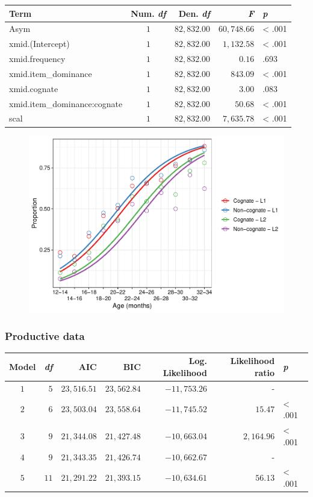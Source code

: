 \documentclass[
  english,
  man,man,floatsintext]{apa6}
\begin{document}
\captionsetup[table]{labelformat=empty,skip=1pt}
\begin{longtable}{lcrrl}
\toprule
Term & Num. \emph{df} & Den. \emph{df} & \emph{F} & \emph{p} \\ 
\midrule
Asym & $1$ & $82,832.00$ & $60,748.66$ & < .001 \\ 
xmid.(Intercept) & $1$ & $82,832.00$ & $1,132.58$ & < .001 \\ 
xmid.frequency & $1$ & $82,832.00$ & $0.16$ & .693 \\ 
xmid.item\_dominance & $1$ & $82,832.00$ & $843.09$ & < .001 \\ 
xmid.cognate & $1$ & $82,832.00$ & $3.00$ & .083 \\ 
xmid.item\_dominance:cognate & $1$ & $82,832.00$ & $50.68$ & < .001 \\ 
scal & $1$ & $82,832.00$ & $7,635.78$ & < .001 \\ 
\bottomrule
\end{longtable}

\begin{figure}

{\centering \includegraphics[width=0.8\linewidth]{trajectories_manuscript_files/figure-latex/comppredictions-1} 

}

\caption{ }\label{fig:comppredictions}
\end{figure}

\hypertarget{productive-data}{%
\subsubsection{Productive data}\label{productive-data}}

\captionsetup[table]{labelformat=empty,skip=1pt}
\begin{longtable}{crrrrrl}
\toprule
Model & \emph{df} & AIC & BIC & Log. Likelihood & Likelihood ratio & \emph{p} \\ 
\midrule
$1$ & $5$ & $23,516.51$ & $23,562.84$ & $-11,753.26$ & - &  \\ 
$2$ & $6$ & $23,503.04$ & $23,558.64$ & $-11,745.52$ & $15.47$ & < .001 \\ 
$3$ & $9$ & $21,344.08$ & $21,427.48$ & $-10,663.04$ & $2,164.96$ & < .001 \\ 
$4$ & $9$ & $21,343.35$ & $21,426.74$ & $-10,662.67$ & - &  \\ 
$5$ & $11$ & $21,291.22$ & $21,393.15$ & $-10,634.61$ & $56.13$ & < .001 \\ 
\bottomrule
\end{longtable}
\end{document}
